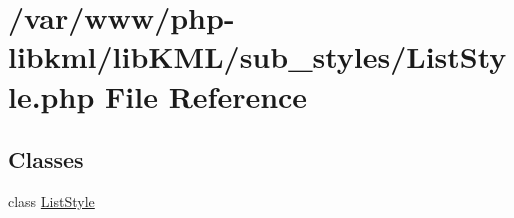 \hypertarget{ListStyle_8php}{
\section{/var/www/php-\/libkml/libKML/sub\_\-styles/ListStyle.php File Reference}
\label{d2/d80/ListStyle_8php}
}
\subsection*{Classes}
\begin{DoxyCompactItemize}
\item 
class \hyperlink{classListStyle}{ListStyle}
\end{DoxyCompactItemize}
